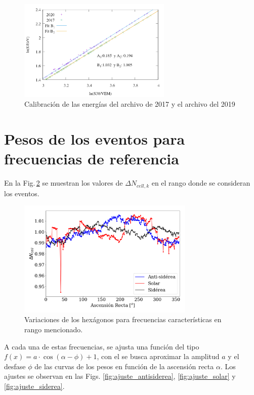        \begin{figure}[H]
          \centering
          \includegraphics[width=0.65\textwidth]{../0_Introduccion/comparacion_reconstruccion.png}
          \caption{Calibración de las energías del archivo de 2017 y el archivo del 2019}
          \label{fig:calibracionE}
        \end{figure}
	
\section{Pesos de los eventos para frecuencias de referencia}

	 En la Fig.\,\ref{pesos_bin_1_2} se muestran los valores de  $\Delta N_{cell,k}$ en el rango donde se consideran los eventos. 
			 
			\begin{figure}[H]
				\centering
				\includegraphics[width=0.75\textwidth]{weights_2013_2020.png}
				\caption{Variaciones de los hexágonos para frecuencias características en rango mencionado. }
				\label{pesos_bin_1_2}
			\end{figure}


	A cada una de estas frecuencias, se ajusta una función del tipo  $f(x)=a\cdot \cos{(\alpha-\phi)} + 1$, con el se busca aproximar la amplitud $a$ y el desfase $\phi$ de las curvas de los pesos en función de la ascensión recta $\alpha$. Los ajustes se observan en las Figs. \ref{fig:ajuste_antisiderea}, \ref{fig:ajuste_solar} y \ref{fig:ajuste_siderea}.


